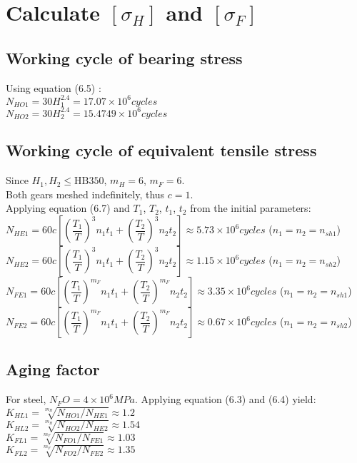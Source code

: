\section{Calculate $ [\sigma_H] $ and $ [\sigma_F] $}
\subsection{Working cycle of bearing stress}
Using equation (6.5) :\\
$ N_{HO1} = 30H_1^{2.4} = 17.07\times10^6\unit{cycles}$\\
$ N_{HO2} = 30H_2^{2.4} = 15.4749\times10^6\unit{cycles}$
\subsection{Working cycle of equivalent tensile stress}
Since $ H_1,H_2\leq\text{HB}350 $, $ m_H=6 $, $ m_F=6 $.\\
Both gears meshed indefinitely, thus $ c=1 $.\\ Applying equation (6.7)  and $ T_1 $, $ T_2 $, $ t_1 $, $ t_2 $ from the initial parameters:\\
$ N_{HE1} = 60c\left[ \left( \dfrac{T_1}{T}\right)^3n_1t_1 + \left( \dfrac{T_2}{T}\right)^3n_2t_2\right] \approx 5.73\times10^6\unit{cycles}$ ($ n_1=n_2=n_{sh1} $)\\
$ N_{HE2} = 60c\left[ \left( \dfrac{T_1}{T}\right)^3n_1t_1 + \left( \dfrac{T_2}{T}\right)^3n_2t_2\right] \approx 1.15\times10^6\unit{cycles}$ ($ n_1=n_2=n_{sh2} $)\\
$ N_{FE1} = 60c\left[ \left( \dfrac{T_1}{T}\right)^{m_F}n_1t_1 + \left( \dfrac{T_2}{T}\right)^{m_F}n_2t_2\right] \approx 3.35\times10^6\unit{cycles}$ ($ n_1=n_2=n_{sh1} $)\\
$ N_{FE2} = 60c\left[ \left( \dfrac{T_1}{T}\right)^{m_F}n_1t_1 + \left( \dfrac{T_2}{T}\right)^{m_F}n_2t_2\right] \approx 0.67\times10^6\unit{cycles}$ ($ n_1=n_2=n_{sh2} $)\\
\subsection{Aging factor}
For steel, $ N_FO = 4\times10^6\unit{MPa}$. Applying equation (6.3) and (6.4)  yield:\\
$K_{HL1} = \sqrt[m_H]{N_{HO1}/N_{HE1}} \approx 1.2$\\
$ K_{HL2} = \sqrt[m_H]{N_{HO2}/N_{HE2}} \approx 1.54$\\
$ K_{FL1} = \sqrt[m_F]{N_{FO1}/N_{FE1}} \approx 1.03$\\
$ K_{FL2} = \sqrt[m_F]{N_{FO2}/N_{FE2}} \approx 1.35$

